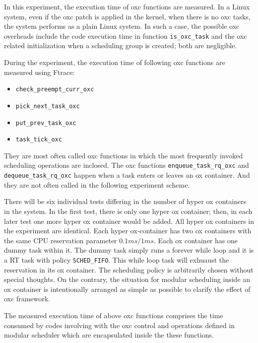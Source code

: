 In this experiment, the execution time of oxc functions are measured.
In a Linux system, even if the oxc patch is applied in the kernel, 
when there is no oxc tasks, the system performs as a plain Linux system. 
In such a case, the possible oxc overheads include the code execution time 
in function \texttt{is\_oxc\_task} and the oxc related initialization when 
a scheduling group is created; both are negligible.

During the experiment, the execution time of following oxc functions are 
measured using Ftrace:
\begin{itemize} 
\item \texttt{check\_preempt\_curr\_oxc}
\item \texttt{pick\_next\_task\_oxc}
\item \texttt{put\_prev\_task\_oxc}
\item \texttt{task\_tick\_oxc}
\end{itemize} 
They are most often called oxc functions in which the most frequently
invoked scheduling operations are inclosed. 
The oxc functions 
\texttt{enqueue\_task\_rq\_oxc} and \texttt{dequeue\_task\_rq\_oxc} 
happen when a task enters or leaves an ox container. And they are not 
often called in the following experiment scheme.

There will be six individual tests differing in the number of hyper ox 
containers in the system. In the first test, there is only one hyper 
ox container; then, in each later test one more hyper ox container 
would be added. All hyper ox containers in the experiment are identical.
Each hyper ox-container has two ox containers with the same CPU 
reservation parameter $0.1ms/1ms$. Each ox container has one dummy task 
within it. The dummy task simply runs a forever while loop and it is a 
RT task with policy \texttt{SCHED\_FIFO}. This while loop task will 
exhuaust the reservation in its ox container. The scheduling policy is 
arbitrarily chosen without special thoughts. On the contrary, the 
situation for modular scheduling inside an ox container is intentionally
arranged as simple as possible to clarify the effect of oxc framework.

The measured execution time of above oxc functions comprises the time 
consumed by codes involving with the oxc control and operations defined 
in modular scheduler which are encapsulated inside the these functions.

